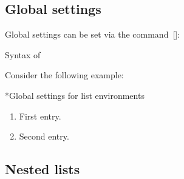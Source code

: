 




\subsection{Global settings}

Global settings can be set via the command~[\optname]:
\begin{showcode}{Syntax of~}
\end{showcode}
Consider the following example:
\begin{showlatex}*{Global settings for list environments}
\begin{enumerate}
  \item
    First entry.
  \item
    Second entry.
\end{enumerate}
\end{showlatex}



\subsection{Nested lists}

